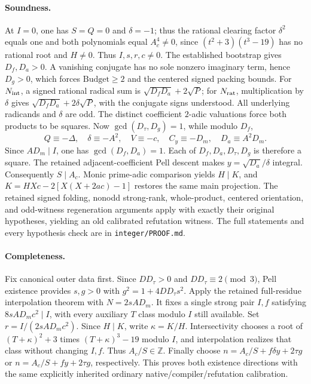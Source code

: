 \paragraph{Soundness.}
At $I=0$, one has $S=Q=0$ and $\delta=-1$; thus the rational
clearing factor $\delta^2$ equals one and both polynomials equal
$A_c^4\ne0$, since
$(t^2+3)(t^3-19)$ has no rational root and $H\ne0$.
Thus $I,s,r,c\ne0$. The established bootstrap gives $D_f,D_a>0$.
A vanishing conjugate has no sole nonzero imaginary term, hence $D_g>0$,
which forces $\mathrm{Budget}\ge2$ and the centered signed packing bounds.
For $N_{\rm int}$, a signed rational radical sum is
$\sqrt{D_fD_a}+2\sqrt P$; for $N_{\rm rat}$, multiplication by $\delta$
gives $\sqrt{D_fD_a}+2\delta\sqrt P$, with the conjugate signs understood.
All underlying radicands and $\delta$ are odd. The distinct coefficient
$2$-adic valuations force both products to be squares.
Now $\gcd(D_\tau,D_g)=1$, while modulo $D_f$,
\[
 Q\equiv-\Delta,\quad \delta\equiv-A^2,\quad
 V\equiv-c,\quad C_y\equiv-D_m,\quad D_a\equiv A^2D_m.
\]
Since $AD_m\mid I$, one has $\gcd(D_f,D_a)=1$.
Each of $D_f,D_a,D_\tau,D_g$ is therefore a square.
The retained adjacent-coefficient Pell descent makes
$y=\sqrt{D_a}/\delta$ integral. Consequently $S\mid A_c$.
Monic prime-adic comparison yields $H\mid K$, and
$K=HXc-2[X(X+2ac)-1]$ restores the same main projection.
The retained signed folding, nonodd strong-rank, whole-product,
centered orientation, and odd-witness regeneration arguments apply with
exactly their original hypotheses, yielding an old calibrated refutation witness.
The full statements and every hypothesis check are in \texttt{integer/PROOF.md}.

\paragraph{Completeness.}
Fix canonical outer data first. Since $DD_\tau>0$ and
$DD_\tau\equiv2\pmod3$, Pell existence provides $s,g>0$ with
$g^2=1+4DD_\tau s^2$.
Apply the retained full-residue interpolation theorem with $N=2sAD_m$.
It fixes a single strong pair $I,f$ satisfying $8sAD_mc^2\mid I$,
with every auxiliary $T$ class modulo $I$ still available.
Set $r=I/(2sAD_mc^2)$. Since $H\mid K$, write $\kappa=K/H$.
Intersectivity chooses a root of $(T+\kappa)^2+3$ times
$(T+\kappa)^3-19$ modulo $I$, and interpolation realizes that class
without changing $I,f$. Thus $A_c/S\in\mathbb Z$.
Finally choose $n=A_c/S+f\delta y+2\tau g$ or
$n=A_c/S+fy+2\tau g$, respectively.
This proves both existence directions with the same explicitly inherited
ordinary native/compiler/refutation calibration.

